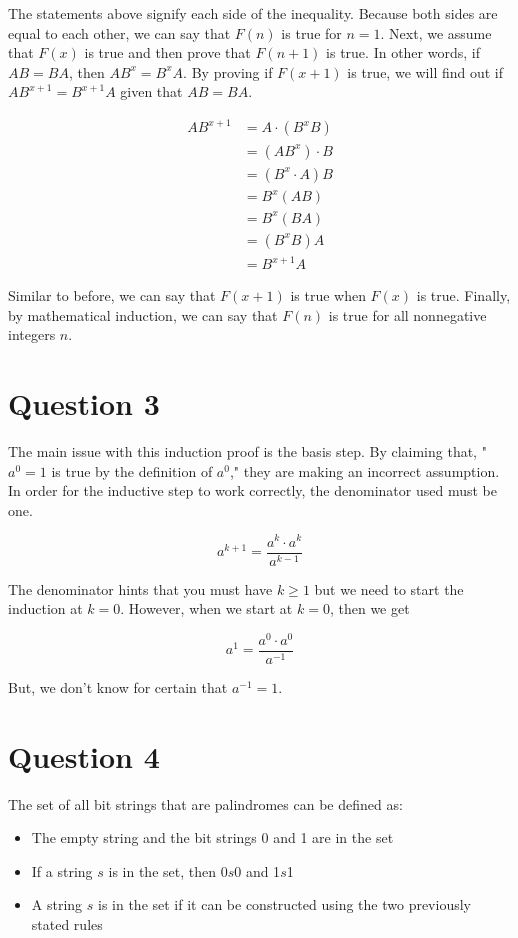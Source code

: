 \documentclass[11pt]{article}
\begin{document}
The statements above signify each side of the inequality. Because both sides are equal to each other, we can say that $F(n)$ is true for $n = 1$. Next, we assume that $F(x)$ is true and then prove that $F(n + 1)$ is true. In other words, if $AB = BA$, then $AB^x = B^xA$. By proving if $F(x + 1)$ is true, we will find out if $AB^{x + 1} = B^{x + 1}A$ given that $AB = BA$.

\begin{align*}
    AB^{x + 1} &= A \cdot (B^xB)\\
    &= (AB^x) \cdot B\\
    &= (B^x \cdot A)B\\
    &= B^x(AB)\\
    &= B^x(BA)\\
    &= (B^xB)A\\
    &= B^{x + 1}A
\end{align*}

Similar to before, we can say that $F(x + 1)$ is true when $F(x)$ is true. Finally, by mathematical induction, we can say that $F(n)$ is true for all nonnegative integers $n$.

\section*{Question 3}
The main issue with this induction proof is the basis step. By claiming that, "$a^0 = 1$ is true by the definition of $a^0$," they are making an incorrect assumption. In order for the inductive step to work correctly, the denominator used must be one.

\[a^{k + 1} = \frac{a^k \cdot a^k}{a^{k - 1}}\]

The denominator hints that you must have $k \geq 1$ but we need to start the induction at $k = 0$. However, when we start at $k = 0$, then we get

\[a^1 = \frac{a^0 \cdot a^0}{a^{-1}}\]

But, we don't know for certain that $a^{-1} = 1$.

\section*{Question 4}
The set of all bit strings that are palindromes can be defined as:

\begin{itemize}
    \item The empty string and the bit strings 0 and 1 are in the set
    \item If a string $s$ is in the set, then 0$s$0 and 1$s$1
    \item A string $s$ is in the set if it can be constructed using the two previously stated rules
\end{itemize}
\end{document}

